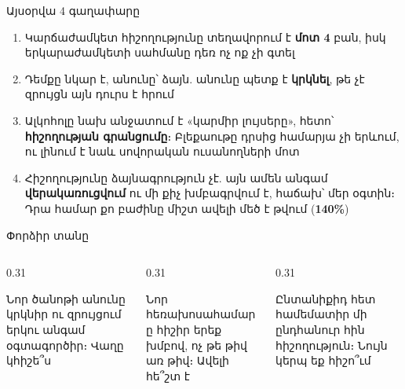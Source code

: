 \notopic

\begin{frame}{Այսօրվա 4 գաղափարը}
  \begin{enumerate}
    \item<1-> Կարճաժամկետ հիշողությունը տեղավորում է \textbf{մոտ 4} բան, իսկ երկարաժամկետի սահմանը դեռ ոչ ոք չի գտել
    \item<2-> Դեմքը նկար է, անունը՝ ձայն. անունը պետք է \textbf{կրկնել}, թե չէ զրույցն այն դուրս է հրում
    \item<3-> Ալկոհոլը նախ անջատում է «կարմիր լույսերը», հետո՝ \textbf{հիշողության գրանցումը}։ Բլեքաութը դրսից համարյա չի երևում, ու լինում է նաև սովորական ուսանողների մոտ
    \item<4-> Հիշողությունը ձայնագրություն չէ. այն ամեն անգամ \textbf{վերակառուցվում} ու մի քիչ խմբագրվում է, հաճախ՝ մեր օգտին։ Դրա համար քո բաժինը միշտ ավելի մեծ է թվում (\textbf{140\%})
  \end{enumerate}
\end{frame}

\begin{frame}{Փորձիր տանը}
  \begin{columns}[T]
    \begin{column}{0.31\textwidth}
      \begin{card}[colback=lavender!35!cardwhite]
        \centering{}\par\smallskip
        \raggedright Նոր ծանոթի անունը կրկնիր ու զրույցում երկու անգամ օգտագործիր։ Վաղը կհիշե՞ս
      \end{card}
    \end{column}
    \begin{column}{0.31\textwidth}
      \begin{card}[colback=mint!30!cardwhite]
        \centering{}\par\smallskip
        \raggedright Նոր հեռախոսահամարը հիշիր երեք խմբով, ոչ թե թիվ առ թիվ։ Ավելի հե՞շտ է
      \end{card}
    \end{column}
    \begin{column}{0.31\textwidth}
      \begin{card}[colback=peach!35!cardwhite]
        \centering{}\par\smallskip
        \raggedright Ընտանիքիդ հետ համեմատիր մի ընդհանուր հին հիշողություն։ Նույն կերպ եք հիշո՞ւմ
      \end{card}
    \end{column}
  \end{columns}
\end{frame}

